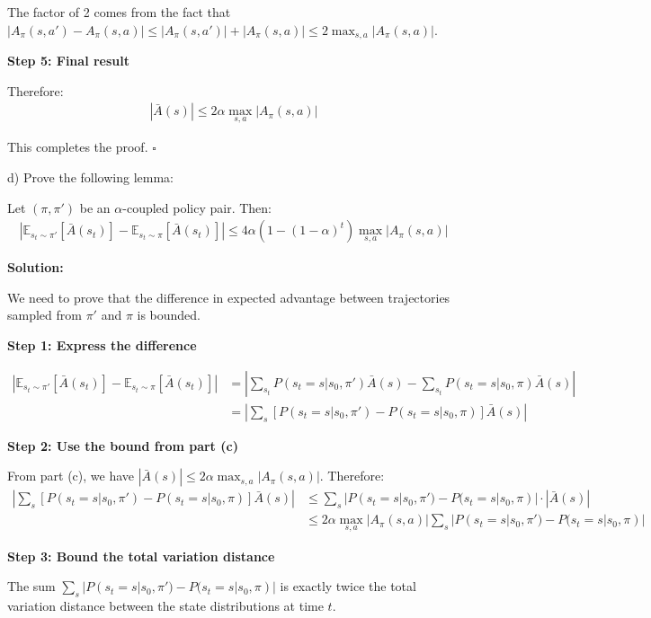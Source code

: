 The factor of 2 comes from the fact that $|A_{\pi}(s, a') - A_{\pi}(s, a)| \le |A_{\pi}(s, a')| + |A_{\pi}(s, a)| \le 2\max_{s, a}|A_{\pi}(s,a)|$.

\textbf{Step 5: Final result}

Therefore:
\begin{align}
|\bar{A}(s)| \le 2\alpha \max_{s, a}|A_{\pi}(s,a)|
\end{align}

This completes the proof. $\square$

d) Prove the following lemma:

\begin{lemma}
    Let $(\pi, \pi')$ be an $\alpha$-coupled policy pair. Then:
    \begin{align*}
        |\mathbb{E}_{s_t \sim \pi'}[\bar{A}(s_t)] - \mathbb{E}_{s_t \sim \pi}[\bar{A}(s_t)]| \le 4\alpha(1-(1-\alpha)^t)\max_{s, a}|A_\pi(s, a)|
    \end{align*}
\end{lemma}

\textbf{Solution:}

We need to prove that the difference in expected advantage between trajectories sampled from $\pi'$ and $\pi$ is bounded.

\textbf{Step 1: Express the difference}

\begin{align}
|\mathbb{E}_{s_t \sim \pi'}[\bar{A}(s_t)] - \mathbb{E}_{s_t \sim \pi}[\bar{A}(s_t)]| &= \left| \sum_{s_t} P(s_t = s | s_0, \pi') \bar{A}(s) - \sum_{s_t} P(s_t = s | s_0, \pi) \bar{A}(s) \right| \\
&= \left| \sum_{s} [P(s_t = s | s_0, \pi') - P(s_t = s | s_0, \pi)] \bar{A}(s) \right|
\end{align}

\textbf{Step 2: Use the bound from part (c)}

From part (c), we have $|\bar{A}(s)| \le 2\alpha \max_{s, a}|A_{\pi}(s,a)|$. Therefore:
\begin{align}
\left| \sum_{s} [P(s_t = s | s_0, \pi') - P(s_t = s | s_0, \pi)] \bar{A}(s) \right| &\le \sum_{s} |P(s_t = s | s_0, \pi') - P(s_t = s | s_0, \pi)| \cdot |\bar{A}(s)| \\
&\le 2\alpha \max_{s, a}|A_{\pi}(s,a)| \sum_{s} |P(s_t = s | s_0, \pi') - P(s_t = s | s_0, \pi)|
\end{align}

\textbf{Step 3: Bound the total variation distance}

The sum $\sum_{s} |P(s_t = s | s_0, \pi') - P(s_t = s | s_0, \pi)|$ is exactly twice the total variation distance between the state distributions at time $t$.

